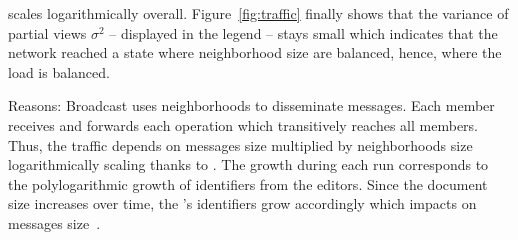 \begin{asparadesc}
  \SPRAY scales logarithmically overall. Figure~\ref{fig:traffic} finally shows
  that the variance of partial views $\sigma^2$ -- displayed in the legend --
  stays small which indicates that the network reached a state where
  neighborhood size are balanced, hence, where the load is balanced.
\item [Reasons:] Broadcast uses neighborhoods to disseminate messages. Each
  member receives and forwards each operation which transitively reaches all
  members. Thus, the traffic depends on messages size multiplied by
  neighborhoods size logarithmically scaling thanks to \SPRAY. The growth during
  each run corresponds to the polylogarithmic growth of identifiers from the
  editors. Since the document size increases over time, the \LSEQ's identifiers
  grow accordingly which impacts on messages size~\cite{nedelec2013lseq}.
\end{asparadesc}


